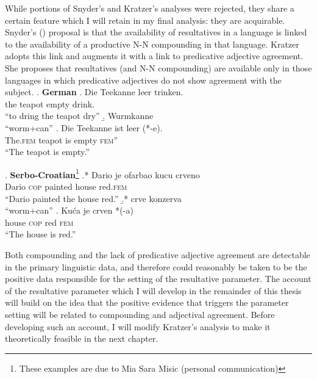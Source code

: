 \documentclass[MilwayThesis]{subfiles}
\begin{document}
While portions of Snyder's and Kratzer's analyses were rejected, they share a certain feature which I will retain in my final analysis: they are acquirable.
Snyder's (\citeyear{snyder1995language}) proposal is that the availability of resultatives in a language is linked to the availability of a productive N-N compounding in that language.
Kratzer adopts this link and augments it with a link to predicative adjective agreement.
She proposes that resultatives (and N-N compounding) are available only in those languages in which predicative adjectives do not show agreement with the subject.
\ex. \textbf{German}
\ag. Die Teekanne leer trinken.\\
the teapot empty drink.\\
``to dring the teapot dry'' \parencite{kratzer2004building}
\b. Wurmkanne\\
``worm+can'' \parencite{snyder2001nature}
\cg. Die Teekanne ist leer (*-e).\\
The.\textsc{fem} teapot is empty \textsc{fem}''\\
``The teapot is empty.''

\ex. \textbf{Serbo-Croatian}\footnote{These examples are due to Mia Sara Misic (personal communication)} 
\ag.* Dario je ofarbao kucu crveno\\
Dario \textsc{cop} painted house red.\textsc{fem}\\
``Dario painted the house red.''
\b.* crve konzerva\\
``worm+can''
\cg. Ku\'ca je crven *(-a)\\
house \textsc{cop} red \textsc{fem}\\
``The house is red.''

Both compounding and the lack of predicative adjective agreement are detectable in the primary linguistic data, and therefore could reasonably be taken to be the positive data responsible for the setting of the resultative parameter.
The account of the resultative parameter which I will develop in the remainder of this thesis will build on the idea that the positive evidence that triggers the parameter setting will be related to compounding and adjectival agreement.
Before developing such an account, I will modify Kratzer's analysis to make it theoretically feasible in the next chapter.
\end{document}
